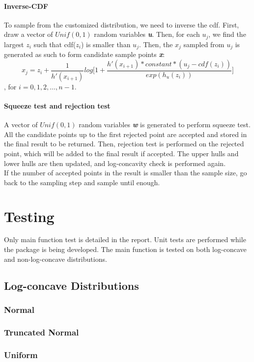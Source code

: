 \documentclass{article}\usepackage[]{graphicx}\usepackage[]{color}
\begin{document}
\paragraph{Inverse-CDF}
To sample from the customized distribution, we need to inverse the cdf. First, 
draw a vector of $Unif(0,1)$ random variables \textbf{\textit{u}}. Then, for each 
$u_j$, we find the largest $z_i$ such that cdf($z_i$) is smaller than $u_j$. Then,
the $x_j$ sampled from $u_j$ is generated as such to form candidate sample
points \textbf{\textit{x}}:\\
\[
x_j = z_i + \frac{1}{h'(x_{i+1})}log \Big[1 + \frac{h'(x_{i+1})*constant*(u_j - cdf(z_i))}{exp(h_u(z_i))} \Big]
\]
, for $i = 0, 1, 2, \dots, n-1$.
\paragraph{Squeeze test and rejection test}
A vector of $Unif(0,1)$ random variables \textbf{\textit{w}} is generated to
perform squeeze test. All the candidate points up to the first rejected point
are accepted and stored in the final result to be returned. Then, rejection test
is performed on the rejected point, which will be added to the final result if 
accepted. The upper hulls and lower hulls are then updated, and log-concavity
check is performed again.\\
If the number of accepted points in the result is smaller than the sample size,
go back to the sampling step and sample until enough.

\section{Testing}
Only main function test is detailed in the report. Unit tests are performed while
the package is being developed. The main function is tested on both log-concave and
non-log-concave distributions.
\subsection{Log-concave Distributions}
\subsubsection{Normal}
\subsubsection{Truncated Normal}
\subsubsection{Uniform}
\end{document}
